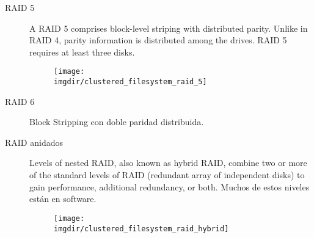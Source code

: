 \documentclass[a4paper, twoside]{article}
\newcommand{\imgdir}{../resources/images} %
\begin{document}
\begin{description}
	\item[RAID 5] A RAID 5 comprises block-level striping with distributed parity. Unlike in RAID 4, parity information is distributed among the drives. RAID 5 requires at least three disks.
	\begin{figure}[H]
		\centering
		\texttt{[image: \\imgdir/clustered\_filesystem\_raid\_5]}
		\label{fig:clustered_filesystem_raid_5}
	\end{figure}

	\item[RAID 6] Block Stripping con doble paridad distribuida.

	\item[RAID anidados] Levels of nested RAID, also known as hybrid RAID, combine two or more of the standard levels of RAID (redundant array of independent disks) to gain performance, additional redundancy, or both. Muchos de estos niveles están en software.
	\begin{figure}[H]
		\centering
		\texttt{[image: \\imgdir/clustered\_filesystem\_raid\_hybrid]}
		\label{fig:clustered_filesystem_raid_hybrid}
	\end{figure}
\end{description}
\end{document}
